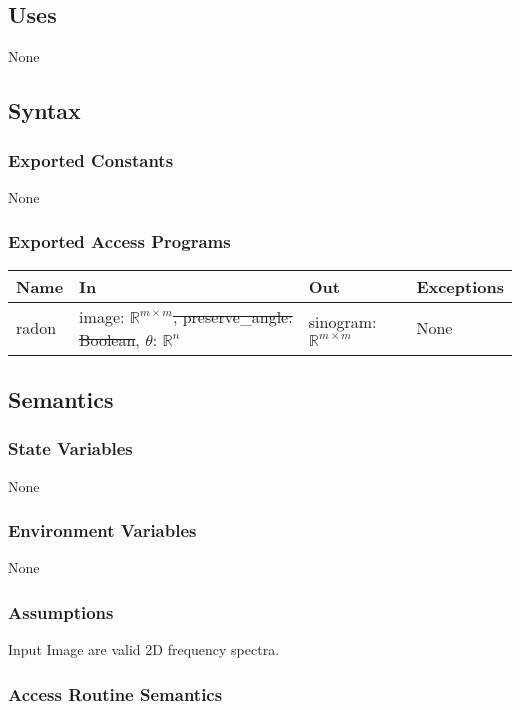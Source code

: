 \documentclass[12pt, titlepage]{article}
\begin{document}
\subsection{Uses}
None

\subsection{Syntax}

\subsubsection{Exported Constants}
None

\subsubsection{Exported Access Programs}

\begin{center}
\begin{tabular}{|l|m{18em}|l|l|}
\hline
\textbf{Name} & \textbf{In} & \textbf{Out} & \textbf{Exceptions} \\
\hline
radon & image: \(\mathbb{R}^{m \times m}\)\st{, preserve\_angle: Boolean}, \(\theta\): \(\mathbb{R}^{n}\) & sinogram: \(\mathbb{R}^{m \times m}\) & None \\
\hline
\end{tabular}
\end{center}

\subsection{Semantics}

\subsubsection{State Variables}
None

\subsubsection{Environment Variables}
None

\subsubsection{Assumptions}
Input Image are valid 2D frequency spectra.

\subsubsection{Access Routine Semantics}
\end{document}
